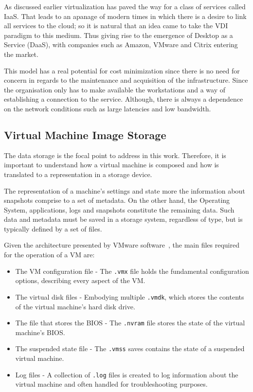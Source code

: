 As discussed earlier virtualization has paved the way for a class of services called IaaS. That leads to an apanage of modern times in which there is a desire to link all services to the cloud; so it is natural that an idea came to take the VDI paradigm to this medium. Thus giving rise to the emergence of Desktop as a Service (DaaS), with companies such as Amazon, VMware and Citrix entering the market.

This model has a real potential for cost minimization since there is no need for concern in regards to the maintenance and acquisition of the infrastructure. Since the organisation only has to make available the workstations and a way of establishing a connection to the service. Although, there is always a dependence on the network conditions such as large latencies and low bandwidth.

\nocite{Nuno2016}
\nocite{Eduardo2016}
\nocite{P2020}


\subsection{Virtual Machine Image Storage} %
\label{sub:vm_storage}

The data storage is the focal point to address in this work. Therefore, it is important to understand how a virtual machine is composed and how is translated to a representation in a storage device.

The representation of a machine's settings and state more the information about snapshots comprise to a set of metadata. On the other hand, the Operating System, applications, logs and snapshots constitute the remaining data. Such data and metadata must be saved in a storage system, regardless of type, but is typically defined by a set of files. 

Given the architecture presented by VMware software~\cite{VMWare_VMFiles}, the main files required for the operation of a VM are:

\begin{itemize}
	\item The VM configuration file - The \texttt{.vmx} file holds the fundamental configuration options, describing every aspect of the VM.
	\item The virtual disk files - Embodying multiple \texttt{.vmdk}, which stores the contents of the virtual machine's hard disk drive.
	\item The file that stores the BIOS - The \texttt{.nvram} file stores the state of the virtual machine's BIOS.
	\item The suspended state file - The \texttt{.vmss} saves contains the state of a suspended virtual machine.
	\item Log files - A collection of \texttt{.log} files is created to log information about the virtual machine and often handled for troubleshooting purposes.
\end{itemize}


